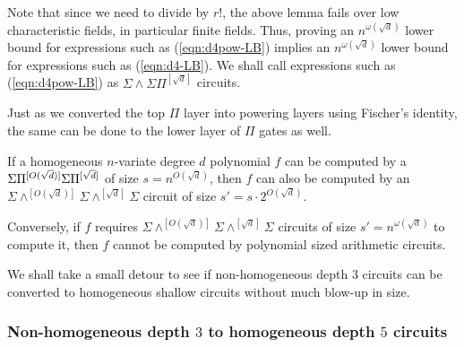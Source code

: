 Note that since we need to divide by $r!$, the above lemma fails over low characteristic fields, in particular finite fields. Thus, proving an $n^{\omega(\sqrt{d})}$ lower bound for expressions such as (\ref{eqn:d4pow-LB}) implies an $n^{\omega(\sqrt{d})}$ lower bound for expressions such as (\ref{eqn:d4-LB}). We shall call expressions such as (\ref{eqn:d4pow-LB}) as $\Sigma\!\wedge\!\Sigma\Pi^{[\sqrt{d}]}$ circuits. 

Just as we converted the top $\Pi$ layer into powering layers using Fischer's identity, the same can be done to the lower layer of $\Pi$ gates as well.

\begin{corollary}\label{cor:pow-genckt}
If a homogeneous $n$-variate degree $d$ polynomial $f$ can be computed by a $\Sigma\Pi^{[O(\sqrt{d})]}\Sigma\Pi^{[\sqrt{d}]}$ of size $s = n^{O(\sqrt{d})}$, then $f$ can also be computed by an $\Sigma\!\wedge^{[O(\sqrt{d})]}\!\Sigma\!\wedge^{[\sqrt{d}]}\!\Sigma$ circuit of size $s' = s \cdot 2^{O(\sqrt{d})}$. 

Conversely, if $f$ requires $\Sigma\!\wedge^{[O(\sqrt{d})]}\!\Sigma\!\wedge^{[\sqrt{d}]}\!\Sigma$ circuits of size $s' = n^{\omega(\sqrt{d})}$ to compute it, then $f$ cannot be computed by polynomial sized arithmetic circuits. 
\end{corollary}

We shall take a small detour to see if non-homogeneous depth $3$ circuits can be converted to homogeneous shallow circuits without much blow-up in size.

\subsubsection{Non-homogeneous depth $3$ to homogeneous depth $5$ circuits}

